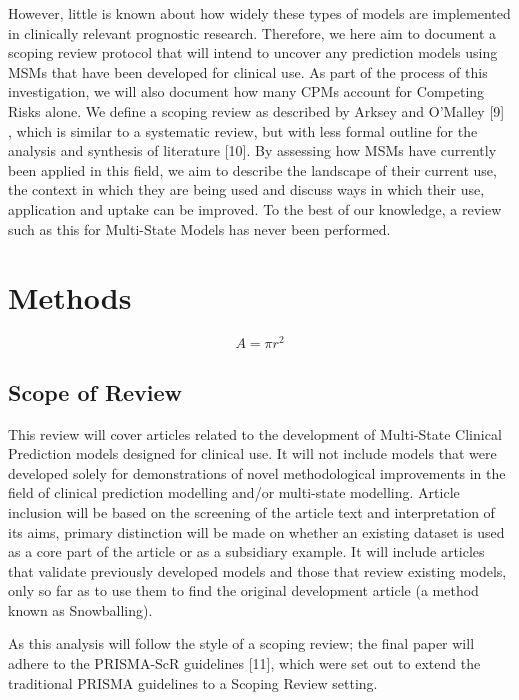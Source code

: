 \documentclass[
]{article}
\begin{document}
However, little is known about how widely these types of models are implemented in clinically relevant prognostic research. Therefore, we here aim to document a scoping review protocol that will intend to uncover any prediction models using MSMs that have been developed for clinical use. As part of the process of this investigation, we will also document how many CPMs account for Competing Risks alone. We define a scoping review as described by Arksey and O'Malley {[}9{]} , which is similar to a systematic review, but with less formal outline for the analysis and synthesis of literature {[}10{]}. By assessing how MSMs have currently been applied in this field, we aim to describe the landscape of their current use, the context in which they are being used and discuss ways in which their use, application and uptake can be improved. To the best of our knowledge, a review such as this for Multi-State Models has never been performed.

\hypertarget{methods}{%
\section{Methods}\label{methods}}

\[ 
A= \pi r^2
\]

\hypertarget{scope-of-review}{%
\subsection{Scope of Review}\label{scope-of-review}}

This review will cover articles related to the development of Multi-State Clinical Prediction models designed for clinical use. It will not include models that were developed solely for demonstrations of novel methodological improvements in the field of clinical prediction modelling and/or multi-state modelling. Article inclusion will be based on the screening of the article text and interpretation of its aims, primary distinction will be made on whether an existing dataset is used as a core part of the article or as a subsidiary example. It will include articles that validate previously developed models and those that review existing models, only so far as to use them to find the original development article (a method known as Snowballing).

As this analysis will follow the style of a scoping review; the final paper will adhere to the PRISMA-ScR guidelines {[}11{]}, which were set out to extend the traditional PRISMA guidelines to a Scoping Review setting.
\end{document}
